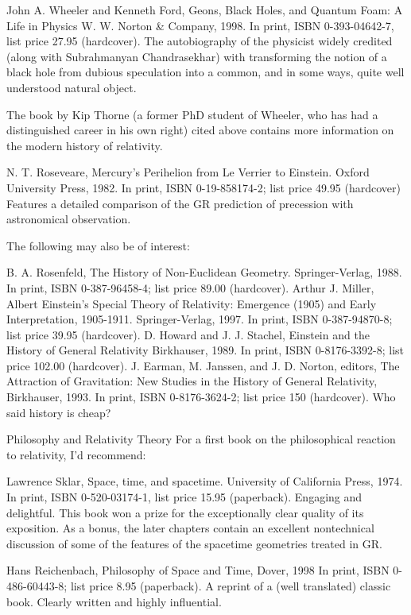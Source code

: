 \documentclass[10pt,a4paper]{book}
\theoremstyle{definition}
\begin{document}
John A. Wheeler and Kenneth Ford,
Geons, Black Holes, and Quantum Foam: A Life in Physics
W. W. Norton \& Company, 1998.
In print, ISBN 0-393-04642-7, list price 27.95 (hardcover).
The autobiography of the physicist widely credited (along with Subrahmanyan Chandrasekhar) with transforming the notion of a black hole from dubious speculation into a common, and in some ways, quite well understood natural object.

The book by Kip Thorne (a former PhD student of Wheeler, who has had a distinguished career in his own right) cited above contains more information on the modern history of relativity.

N. T. Roseveare,
Mercury's Perihelion from Le Verrier to Einstein.
Oxford University Press, 1982.
In print, ISBN 0-19-858174-2; list price 49.95 (hardcover)
Features a detailed comparison of the GR prediction of precession with astronomical observation.

The following may also be of interest:

B. A. Rosenfeld,
The History of Non-Euclidean Geometry.
Springer-Verlag, 1988.
In print, ISBN 0-387-96458-4; list price 89.00 (hardcover).
Arthur J. Miller,
Albert Einstein's Special Theory of Relativity: Emergence (1905) and Early Interpretation, 1905-1911.
Springer-Verlag, 1997.
In print, ISBN 0-387-94870-8; list price 39.95 (hardcover).
D. Howard and J. J. Stachel,
Einstein and the History of General Relativity
Birkhauser, 1989.
In print, ISBN 0-8176-3392-8; list price 102.00 (hardcover).
J. Earman, M. Janssen, and J. D. Norton, editors,
The Attraction of Gravitation: New Studies in the History of General Relativity,
Birkhauser, 1993.
In print, ISBN 0-8176-3624-2; list price 150 (hardcover).
Who said history is cheap?




Philosophy and Relativity Theory
For a first book on the philosophical reaction to relativity, I'd recommend:

Lawrence Sklar,
Space, time, and spacetime.
University of California Press, 1974.
In print, ISBN 0-520-03174-1, list price 15.95 (paperback).
Engaging and delightful.  This book won a prize for the exceptionally clear quality of its exposition.  As a bonus, the later chapters contain an excellent nontechnical discussion of some of the features of the spacetime geometries treated in GR.

Hans Reichenbach,
Philosophy of Space and Time,
Dover, 1998
In print, ISBN 0-486-60443-8; list price 8.95 (paperback).
A reprint of a (well translated) classic book.  Clearly written and highly influential.
\end{document}
